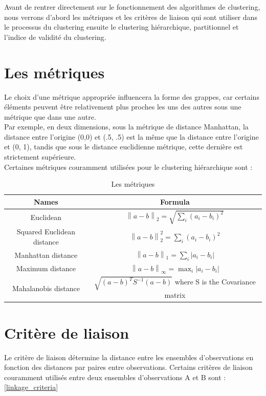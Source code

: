 Avant de rentrer directement sur le fonctionnement des algorithmes de clustering, nous verrons d’abord les métriques et les critères de liaison qui sont utiliser dans le processus du clustering ensuite le clustering hiérarchique, partitionnel et l’indice de validité du clustering.
\section{Les métriques}
Le choix d'une métrique appropriée influencera la forme des grappes, car certains éléments peuvent être relativement plus proches les uns des autres sous une métrique que dans une autre. \\
Par exemple, en deux dimensions, sous la métrique de distance Manhattan, la distance entre l'origine (0,0) et (.5, .5) est la même que la distance entre l'origine et (0, 1), tandis que sous le distance euclidienne métrique, cette dernière est strictement supérieure. \\
Certaines métriques couramment utilisées pour le clustering hiérarchique sont :

\begin{table}[!htbp]
    \centering
	\begin{tabular}{|c| c|}
	\hline
	\rowcolor{blueforest}
	\color{white} \textbf{Names} & \color{white} \textbf{Formula}  \\ \hline
	Euclidean  & \(\displaystyle \left\lVert a - b\right\rVert_{2} = \sqrt{\sum_{i}^{} (a_{i} - b_{i})^{2} } \)   \\  \hline
	Squared Euclidean distance  & \(\displaystyle \left\lVert a - b\right\rVert_{2}^{2} = \sum_{i}^{} (a_{i} - b_{i})^{2} \)   \\  \hline
	Manhattan distance  & \(\displaystyle \left\lVert a - b\right\rVert_{1} = \sum_{i}^{} \left\lvert a_{i} - b_{i} \right\rvert \)   \\  \hline
	Maximum distance  & \(\displaystyle \left\lVert a - b\right\rVert_{\infty} = \max_{i} \left\lvert a_{i} - b_{i} \right\rvert  \)   \\  \hline
	Mahalanobis distance  & \(\displaystyle \sqrt{(a-b)^{T}S^{-1}(a-b)} \) where S is the Covariance matrix   \\  \hline
	\end{tabular}
	\caption{Les métriques }
	\label{metrics}
\end{table}

\section{Critère de liaison}
Le critère de liaison détermine la distance entre les ensembles d'observations en fonction des distances par paires entre observations. Certains critères de liaison couramment utilisés entre deux ensembles d’observations A et B sont : \ref{linkage_criteria}


